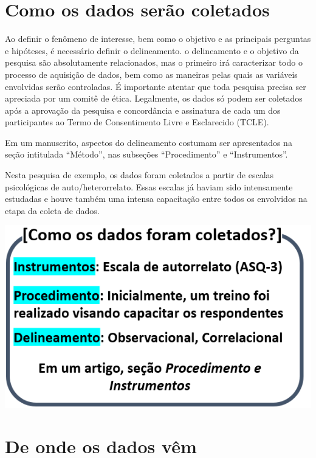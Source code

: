 \documentclass[
]{book}
\begin{document}
\hypertarget{como-os-dados-seruxe3o-coletados}{%
\section{Como os dados serão coletados}\label{como-os-dados-seruxe3o-coletados}}

Ao definir o fenômeno de interesse, bem como o objetivo e as principais perguntas e hipóteses, é necessário definir o delineamento. o delineamento e o objetivo da pesquisa são absolutamente relacionados, mas o primeiro irá caracterizar todo o processo de aquisição de dados, bem como as maneiras pelas quais as variáveis envolvidas serão controladas. É importante atentar que toda pesquisa precisa ser apreciada por um comitê de ética. Legalmente, os dados só podem ser coletados após a aprovação da pesquisa e concordância e assinatura de cada um dos participantes ao Termo de Consentimento Livre e Esclarecido (TCLE).

Em um manuscrito, aspectos do delineamento costumam ser apresentados na seção intitulada ``Método'', nas subseções ``Procedimento'' e ``Instrumentos''.

Nesta pesquisa de exemplo, os dados foram coletados a partir de escalas psicológicas de auto/heterorrelato. Essas escalas já haviam sido intensamente estudadas e houve também uma intensa capacitação entre todos os envolvidos na etapa da coleta de dados.

\includegraphics{./img/cap_pesquisa_aplicada_como.png}

\hypertarget{de-onde-os-dados-vuxeam}{%
\section{De onde os dados vêm}\label{de-onde-os-dados-vuxeam}}
\end{document}

